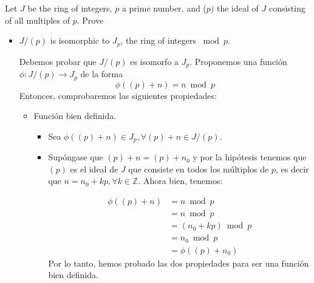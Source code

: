 \begin{problema}[Problema 3]

    Let $J$ be the ring of integers, $p$ a prime number, and ($p)$ the ideal of $J$ consisting of all multiples of $p$. Prove
    \begin{itemize}
        \item $J /(p)$ is isomorphic to $J_{p}$, the ring of integers $\bmod p$.
        \begin{dem}
            Debemos probar que $J /(p)$ es isomorfo a $J_{p}$. Proponemos una función $\phi: J/(p)\to J_p$ de la forma 
            $$\phi((p)+n)=n\bmod p$$
            Entonces, comprobaremos las siguientes propiedades: 
            \begin{itemize}
                \item Función bien definida. 
                    \begin{itemize}
                        \item Sea $\phi((p)+n)\in J_p,\forall (p)+n\in J/(p)$.
                        \item Supóngase que $(p)+n=(p)+n_0$ y por la hipótesis tenemos que $(p)$ es el ideal de $J$ que consiste en todos los múltiplos de $p$, es decir que $n=n_0+kp,\forall k\in\mathbb{Z}$. Ahora bien, tenemos:
                        
                        \begin{align*}
                            \phi((p)+n)&= n\bmod p\\
                                       &= n\bmod p\\
                                       &= (n_0+kp) \bmod p\\
                                       &= n_0 \bmod p\\
                                       &= \phi((p)+n_0)
                        \end{align*}
                        Por lo tanto, hemos probado las dos propiedades para ser una función bien definida. 
                        

\end{itemize}
\end{itemize}
\end{dem}
\end{itemize}
\end{problema}

